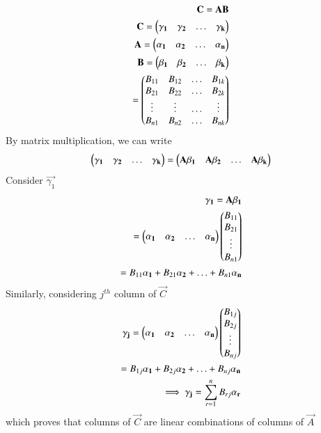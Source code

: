 \begin{align}
\mathbf{C}=\mathbf{A}\mathbf{B}\\
\mathbf{C}=\begin{pmatrix}\mathbf{\gamma_1}&\mathbf{\gamma_2}&\hdots&\mathbf{\gamma_k}\end{pmatrix}\\
\mathbf{A}=\begin{pmatrix}\mathbf{\alpha_1}&\mathbf{\alpha_2}&\hdots&\mathbf{\alpha_n}\end{pmatrix}\\
\mathbf{B}=\begin{pmatrix}\mathbf{\beta_1}&\mathbf{\beta_2}&\hdots&\mathbf{\beta_k}\end{pmatrix}\\
=\begin{pmatrix}B_{11}&B_{12}&\hdots&B_{1k}\\B_{21}&B_{22}&\hdots&B_{2k}\\\vdots&\vdots&\hdots&\vdots\\B_{n1}&B_{n2}&\hdots&B_{nk}\end{pmatrix}
\end{align}
By matrix multiplication, we can write
\begin{align}
  \begin{pmatrix}\mathbf{\gamma_1}&\mathbf{\gamma_2}&\hdots&\mathbf{\gamma_k}\end{pmatrix}=\begin{pmatrix}\mathbf{A}\mathbf{\beta_1}&\mathbf{A}\mathbf{\beta_2}&\hdots&\mathbf{A}\mathbf{\beta_k}\end{pmatrix}
\end{align}
Consider $\vec{\gamma_1}$
\begin{align}
    \mathbf{\gamma_1}=\mathbf{A}\mathbf{\beta_1}\\
    =\begin{pmatrix}\mathbf{\alpha_1}&\mathbf{\alpha_2}&\hdots&\mathbf{\alpha_n}\end{pmatrix}\begin{pmatrix}B_{11}\\B_{21}\\\vdots\\B_{n1}\end{pmatrix}\\=B_{11}\mathbf{\alpha_1}+B_{21}\mathbf{\alpha_2}+\hdots+B_{n1}\mathbf{\alpha_n}
\end{align}
Similarly, considering $j^{th}$ column of $\vec{C}$
\begin{align}
  \mathbf{\gamma_j}= \begin{pmatrix}\mathbf{\alpha_1}&\mathbf{\alpha_2}&\hdots&\mathbf{\alpha_n}\end{pmatrix}\begin{pmatrix}B_{1j}\\B_{2j}\\\vdots\\B_{nj}\end{pmatrix}\\=B_{1j}\mathbf{\alpha_1}+B_{2j}\mathbf{\alpha_2}+\hdots+B_{nj}\mathbf{\alpha_n} \\
  \implies  \mathbf{\gamma_j}= \sum_{r=1}^{n}B_{rj}\mathbf{\alpha_r} 
\end{align}
which proves that columns of $\vec{C}$ are linear combinations of columns of $\vec{A}$

